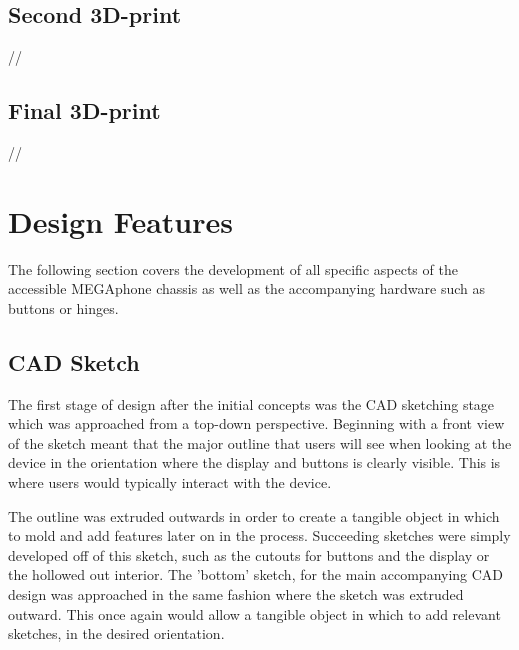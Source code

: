 
\subsection{Second 3D-print}
//

\subsection{Final 3D-print}
//


\section{Design Features}

The following section covers the development of all specific aspects of the accessible MEGAphone chassis as well as the accompanying hardware such as buttons or hinges.

\subsection{CAD Sketch}

The first stage of design after the initial concepts was the CAD sketching stage which was approached from a top-down perspective.
Beginning with a front view of the sketch meant that the major outline that users will see when looking at the device in the orientation where the display and buttons is clearly visible. %
This is where users would typically interact with the device.

The outline was extruded outwards in order to create a tangible object in which to mold and add features later on in the process.
Succeeding sketches were simply developed off of this sketch, such as the cutouts for buttons and the display or the hollowed out interior.
The 'bottom' sketch, for the main accompanying CAD design was approached in the same fashion where the sketch was extruded outward.
This once again would allow a tangible object in which to add relevant sketches, in the desired orientation.

